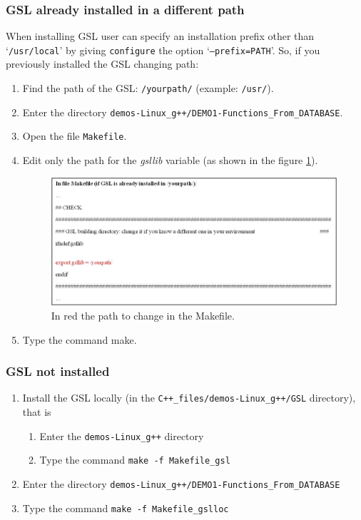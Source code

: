 \documentclass[10pt]{article}
\begin{document}
\subsubsection{GSL already installed in a different path}

When installing GSL user can specify an installation prefix other than `{\tt /usr/local}' by giving {\tt configure} the
option `{\tt --prefix=PATH}'. So, if you previously installed the GSL changing path:
\begin{enumerate}
 \item Find the path of the GSL: {\tt /yourpath/} (example: {\tt /usr/}).
\item Enter the directory {\tt demos-Linux\_g++/DEMO1-Functions\_From\_DATABASE}.
\item Open the file {\tt Makefile}.
\item Edit only the path for the \emph{gsllib} variable (as shown in the figure \ref{fig:gsl1}).

\begin{figure}[!h]
\begin{center}
\includegraphics[scale=0.6]{Immagine9}
\caption{\label{fig:gsl1}In red the path to change in the Makefile.}
\end{center}
\end{figure}


\item Type the command make.
\end{enumerate}




\subsubsection{GSL not installed}
\begin{enumerate}
 \item Install the GSL locally (in the {\tt C++\_files/demos-Linux\_g++/GSL} directory), that is
	    \begin{enumerate}
	    \item Enter the {\tt demos-Linux\_g++} directory
	    \item Type the command {\tt make -f Makefile\_gsl}
	    \end{enumerate}
 \item Enter the directory {\tt demos-Linux\_g++/DEMO1-Functions\_From\_DATABASE}
 \item Type the command {\tt make -f Makefile\_gslloc}
\end{enumerate}
\end{document}
